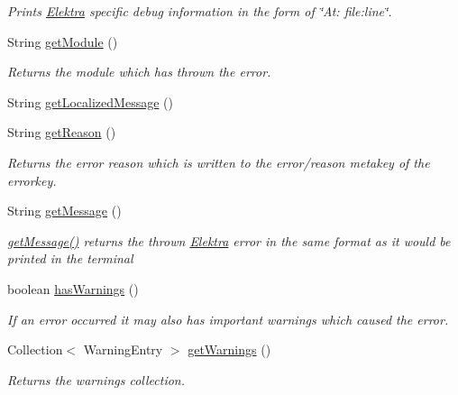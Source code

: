 \begin{DoxyCompactItemize}
\begin{DoxyCompactList}\small\item\em Prints \hyperlink{interfaceorg_1_1libelektra_1_1Elektra}{Elektra} specific debug information in the form of \char`\"{}\+At\+: file\+:line\char`\"{}. \end{DoxyCompactList}\item 
String \hyperlink{classorg_1_1libelektra_1_1exception_1_1KDBException_a241bb6bc3b93677bc4b51d23b917f9d1}{get\+Module} ()
\begin{DoxyCompactList}\small\item\em Returns the module which has thrown the error. \end{DoxyCompactList}\item 
String \hyperlink{classorg_1_1libelektra_1_1exception_1_1KDBException_a80c8598787cff127a83290c87450dde0}{get\+Localized\+Message} ()
\item 
String \hyperlink{classorg_1_1libelektra_1_1exception_1_1KDBException_ab3883ac714dca52759f08aaee708cab0}{get\+Reason} ()
\begin{DoxyCompactList}\small\item\em Returns the error reason which is written to the {\ttfamily error/reason} metakey of the errorkey. \end{DoxyCompactList}\item 
String \hyperlink{classorg_1_1libelektra_1_1exception_1_1KDBException_a78bbf7b7767f90840ba6bdb22bebfe11}{get\+Message} ()
\begin{DoxyCompactList}\small\item\em \hyperlink{classorg_1_1libelektra_1_1exception_1_1KDBException_a78bbf7b7767f90840ba6bdb22bebfe11}{get\+Message()} returns the thrown \hyperlink{interfaceorg_1_1libelektra_1_1Elektra}{Elektra} error in the same format as it would be printed in the terminal \end{DoxyCompactList}\item 
boolean \hyperlink{classorg_1_1libelektra_1_1exception_1_1KDBException_a0387189fd5d08448c81a7777f80f8940}{has\+Warnings} ()
\begin{DoxyCompactList}\small\item\em If an error occurred it may also has important warnings which caused the error. \end{DoxyCompactList}\item 
Collection$<$ Warning\+Entry $>$ \hyperlink{classorg_1_1libelektra_1_1exception_1_1KDBException_ae39b71862c220a14f44dff3e5a515239}{get\+Warnings} ()
\begin{DoxyCompactList}\small\item\em Returns the warnings collection. \end{DoxyCompactList}\end{DoxyCompactItemize}


